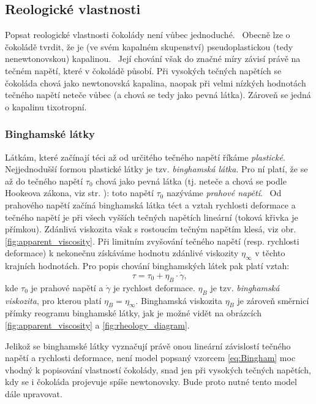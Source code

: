 \documentclass[12pt]{article}
\begin{document}
\subsection{Reologické vlastnosti}
\label{sec:Reologické_vlastnosti_čokolády}

Popsat reologické vlastnosti čokolády není vůbec jednoduché.~\cite{Article:Determination_of_chocolate_viscosity} Obecně lze o čokoládě tvrdit, že je (ve svém kapalném skupenství) pseudoplastickou (tedy nenewtonovskou) kapalinou.~\cite{Article:Comparison_of_models_chocolate}\cite{Article:Rapid_and_economic_chocolate_viscosity} Její chování však do značné míry závisí právě na tečném napětí, které v čokoládě působí. Při vysokých tečných napětích se čokoláda chová jako newtonovská kapalina, naopak při velmi nízkých hodnotách tečného napětí neteče vůbec (a chová se tedy jako pevná látka). Zároveň se jedná o kapalinu tixotropní.~\cite{Article:Determination_of_chocolate_viscosity}

\subsubsection{Binghamské látky}

Látkám, které začínají téci až od určitého tečného napětí říkáme \emph{plastické}.~\cite{material:Nenewtonovské_kapaliny}\cite{material:Viskozita_a_povrchove_napeti} Nejjednodušší formou plastické látky je tzv. \emph{binghamská látka}. Pro ní platí, že se až do tečného napětí $\tau_0$ chová jako pevná látka (tj. neteče a chová se podle Hookeova zákona, viz str. \pageref{sec:Hookeův_zákon}): toto napětí $\tau_0$ nazýváme \emph{prahové napětí}.~\cite{wiki:Bingham_plastic}\cite{material:Tokove_chovani_reologicke_modely} Od prahového napětí začíná binghamská látka téct a vztah rychlosti deformace a tečného napětí je při všech vyšších tečných napětích lineární (toková křivka je přímkou). Zdánlivá viskozita však s rostoucím tečným napětím klesá, viz obr. \ref{fig:apparent_viscosity}. Při limitním zvyšování tečného napětí (resp. rychlosti deformace) k nekonečnu získáváme hodnotu zdánlivé viskozity $\eta_\infty$ v těchto krajních hodnotách. Pro popis chování binghamských látek pak platí vztah:~\cite{Article:Comparison_of_models_chocolate}\cite{Article:Extended_casson_equation}
\begin{equation}
    \tau = \tau_0 + \eta_B\cdot \dot\gamma\text{,}
    \label{eq:Bingham}
\end{equation}
kde $\tau_0$ je prahové napětí a $\dot\gamma$ je rychlost deformace. $\eta_B$ je tzv. \emph{binghamská viskozita}, pro kterou platí $\eta_B = \eta_\infty$. Binghamská viskozita $\eta_B$ je zároveň směrnicí přímky reogramu binghamské látky, jak je možné vidět na obrázcích \ref{fig:apparent_viscosity} a \ref{fig:rheology_diagram}.
\par\noindent
Jelikož se binghamské látky vyznačují právě onou lineární závislostí tečného napětí a rychlosti deformace, není model popsaný vzorcem \ref{eq:Bingham} moc vhodný k popisování vlastností čokolády, snad jen při vysokých tečných napětích, kdy se i čokoláda projevuje spíše newtonovsky. Bude proto nutné tento model dále upravovat.
\end{document}
